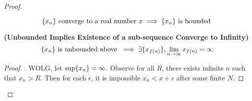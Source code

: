 \documentclass{report}
\begin{document}
\begin{proof}
\begin{theorem}
\begin{equation}
\{ x_n \}\text{ converge to a real number $x$}\implies \{ x_n \}\text{ is bounded }
\end{equation}
\end{theorem}
\begin{corollary}
\label{4.1.4}
\textbf{(Unbounded Implies Existence of a sub-sequence Converge to Infinity)}
\begin{equation}
\{ x_n \}\text{ is unbounded above }\implies \exists \{ x_{f(n)} \}, \lim_{n\to\infty}x_{f(n)}=\infty
\end{equation}
\end{corollary}
\begin{proof}
. WOLG, let $\sup \{ x_n \}=\infty$. Observe for all $R$, there exists infinite $n$ such that  $x_n>R$. Then for each $\epsilon $, it is impossible $x_n<x+\epsilon $ after some finite $N$.  \CaC
\end{proof}
\end{proof}
\end{document}
